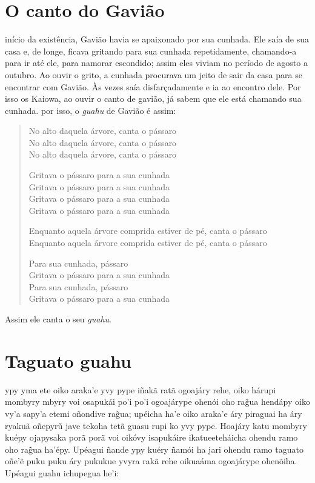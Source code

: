 \chapter{O canto do Gavião}

 início da existência, Gavião havia se apaixonado por sua cunhada. Ele
saía de sua casa e, de longe, ficava gritando para sua cunhada
repetidamente, chamando-a para ir até ele, para namorar escondido; assim
eles viviam no período de agosto a outubro. Ao ouvir o grito, a cunhada
procurava um jeito de sair da casa para se encontrar com Gavião. Às
vezes saía disfarçadamente e ia ao encontro dele. Por isso os Kaiowa, ao
ouvir o canto de gavião, já sabem que ele está chamando sua cunhada. por
isso, o \textit{guahu} de Gavião é assim:

\begin{verse}
No alto daquela árvore, canta o pássaro\\
No alto daquela árvore, canta o pássaro\\
No alto daquela árvore, canta o pássaro

Gritava o pássaro para a sua cunhada\\
Gritava o pássaro para a sua cunhada\\
Gritava o pássaro para a sua cunhada\\
Gritava o pássaro para a sua cunhada

Enquanto aquela árvore comprida estiver de pé, \qb{}canta o pássaro\\
Enquanto aquela árvore comprida estiver de pé, \qb{}canta o pássaro

Para sua cunhada, pássaro\\ \EP[1]
Gritava o pássaro para a sua cunhada\\
Para sua cunhada, pássaro\\
Gritava o pássaro para a sua cunhada
\end{verse}

Assim ele canta o seu \textit{guahu}.

\chapter{Taguato guahu}

 ypy yma ete oiko araka'e yvy pype iñakã ratã ogoajáry rehe, oiko
hárupi mombyry mbyry voi osapukái po'i po'i ogoajárype ohenói oho rag̃ua
hendápy oiko vy'a sapy'a etemi oñondive rag̃ua; upéicha ha'e oiko araka'e
áry piraguai ha áry ryakuã oñepyrũ jave tekoha tetã guasu rupi ko yvy
pype. Hoajáry katu mombyry kuépy ojapysaka porã porã voi oikóvy
isapukáire ikatueeteháicha ohendu ramo oho rag̃ua ha'épy. Upéagui ñande
ypy kuéry ñamói ha jari ohendu ramo taguato oñe'ẽ puku puku áry pukukue
yvyra rakã rehe oikuaáma ogoajárype ohenõiha. Upéagui guahu ichupegua
he'i:

